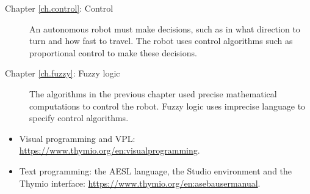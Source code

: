 \begin{description}
\item[Chapter \ref{ch.control}: Control] An autonomous
robot must make decisions, such as in what direction to turn and how
fast to travel. The robot uses control algorithms such as proportional
control to make these decisions.

\item[Chapter \ref{ch.fuzzy}: Fuzzy logic] The algorithms in the
previous chapter used precise mathematical computations to control the
robot. Fuzzy logic uses imprecise language to specify control
algorithms.

\end{description}




\begin{itemize}
\item Visual programming and VPL:
\href{https://www.thymio.org/en:visualprogramming}{https://www.thymio.org/en:visualprogramming}.

\item Text programming: the AESL language, the Studio environment and the Thymio interface:
\href{https://www.thymio.org/en:asebausermanual}{https://www.thymio.org/en:asebausermanual}.
\end{itemize}
